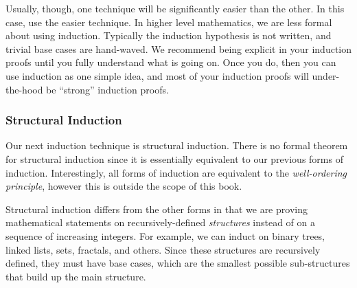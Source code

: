 \documentclass[main.tex]{subfiles}
\begin{document}
Usually, though, one technique will be significantly easier than the other. In this case, use the easier technique. In higher level mathematics, we are less formal about using induction. Typically the induction hypothesis is not written, and trivial base cases are hand-waved. We recommend being explicit in your induction proofs until you fully understand what is going on. Once you do, then you can use induction as one simple idea, and most of your induction proofs will under-the-hood be ``strong'' induction proofs.

\subsubsection{Structural Induction}

Our next induction technique is structural induction. There is no formal theorem for structural induction since it is essentially equivalent to our previous forms of induction. Interestingly, all forms of induction are equivalent to the \textit{well-ordering principle}, however this is outside the scope of this book.

Structural induction differs from the other forms in that we are proving mathematical statements on recursively-defined \textit{structures} instead of on a sequence of increasing integers. For example, we can induct on binary trees, linked lists, sets, fractals, and others. Since these structures are recursively defined, they must have base cases, which are the smallest possible sub-structures that build up the main structure.
\end{document}
